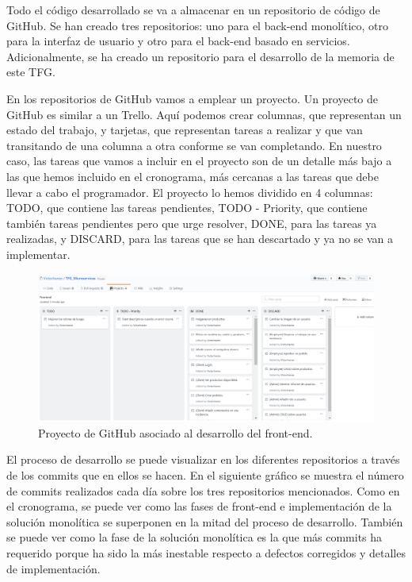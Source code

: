 \documentclass[11pt,spanish,listoffigures]{tfgetsinf}
\begin{document}
Todo el código desarrollado se va a almacenar en un repositorio de código de GitHub. Se han creado tres repositorios: uno para el back-end monolítico, otro para la interfaz de usuario y otro para el back-end basado en servicios. Adicionalmente, se ha creado un repositorio para el desarrollo de la memoria de este TFG.

En los repositorios de GitHub vamos a emplear un proyecto. Un proyecto de GitHub es similar a un Trello. Aquí podemos crear columnas, que representan un estado del trabajo, y tarjetas, que representan tareas a realizar y que van transitando de una columna a otra conforme se van completando. En nuestro caso, las tareas que vamos a incluir en el proyecto son de un detalle más bajo a las que hemos incluido en el cronograma, más cercanas a las tareas que debe llevar a cabo el programador. El proyecto lo hemos dividido en 4 columnas: TODO, que contiene las tareas pendientes, TODO - Priority, que contiene también tareas pendientes pero que urge resolver, DONE, para las tareas ya realizadas, y DISCARD, para las tareas que se han descartado y ya no se van a implementar.

\begin{figure}[h]
\centering
\includegraphics[scale=0.35]{GitHubProject}
\caption{Proyecto de GitHub asociado al desarrollo del front-end.}
\end{figure}

\newpage


El proceso de desarrollo se puede visualizar en los diferentes repositorios a través de los commits que en ellos se hacen. En el siguiente gráfico se muestra el número de commits realizados cada día sobre los tres repositorios mencionados. Como en el cronograma, se puede ver como las fases de front-end e implementación de la solución monolítica se superponen en la mitad del proceso de desarrollo. También se puede ver como la fase de la solución monolítica es la que más commits ha requerido porque ha sido la más inestable respecto a defectos corregidos y detalles de implementación.
\end{document}
